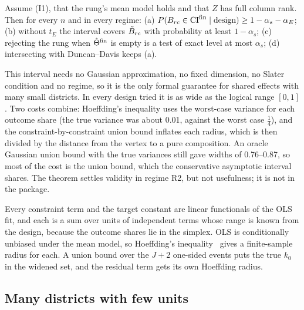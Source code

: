 \begin{theorem}\label{thm:finite}
Assume (I1), that the rung's mean model holds and that $Z$ has full column rank.
Then for every $n$ and in every regime: (a)
$P(B_{rc}\in\mathrm{CI}^{\rm fin}\mid\text{design})\ge1-\alpha_s-\alpha_E$; (b) without $t_E$
the interval covers $\tilde B_{rc}$ with probability at least $1-\alpha_s$; (c)
rejecting the rung when $\hat\Theta^{\rm fin}$ is empty is a test of exact level at
most $\alpha_s$; (d) intersecting with Duncan--Davis keeps (a).
\end{theorem}
\begin{reading}
This interval needs no Gaussian approximation, no fixed dimension, no Slater
condition and no regime, so it is the only formal guarantee for shared effects with
many small districts. In every design tried it is as wide as the logical range
$[0,1]$. Two costs combine: Hoeffding's inequality uses the worst-case variance
for each outcome share (the true variance was about 0.01, against the worst case
$\tfrac14$), and the
constraint-by-constraint union bound inflates each radius, which is then divided
by the distance from the vertex to a pure composition. An oracle Gaussian union
bound with the true variances still gave widths of 0.76--0.87, so most of the cost
is the union bound, which the conservative asymptotic interval shares. The theorem
settles validity in regime R2, but not usefulness; it is not in the package.
\end{reading}
\begin{sketch}
Every constraint term and the target constant are linear functionals of the OLS
fit, and each is a sum over units of independent terms whose range is known from
the design, because the outcome shares lie in the simplex. OLS is conditionally
unbiased under the mean model, so Hoeffding's inequality~\citep{hoeffding1963}
gives a finite-sample radius for each. A union bound over the $J+2$ one-sided
events puts the true $k_0$ in the widened set, and the residual term gets its own
Hoeffding radius.
\end{sketch}

\subsection{Many districts with few units}

